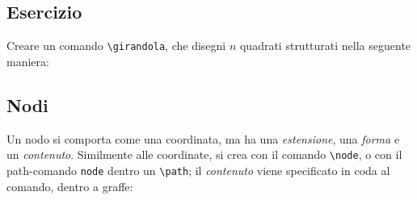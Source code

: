 \documentclass{article}
\DeclareRobustCommand{\ExternalLink}{\faLink}
\DeclareRobustCommand{\riferimento}[1]{~\href{#1}{\ExternalLink}}
\newcommand{\textcomando}[1]{\texttt{\textbackslash #1}}
\begin{document}


 
\subsection{Esercizio}

Creare un comando \texttt{\textbackslash girandola}, che disegni $n$ quadrati strutturati nella seguente maniera:



\newpage


\subsection{Nodi\riferimento{https://tikz.dev/tikz-shapes}}

Un nodo si comporta come una coordinata, ma ha una {\em estensione}, una {\em forma} e un {\em contenuto}.
Similmente alle coordinate, si crea con il comando \textcomando{node}, o con il path-comando \texttt{node} dentro un \textcomando{path}; il {\em contenuto} viene specificato in coda al comando, dentro a graffe:
\end{document}
